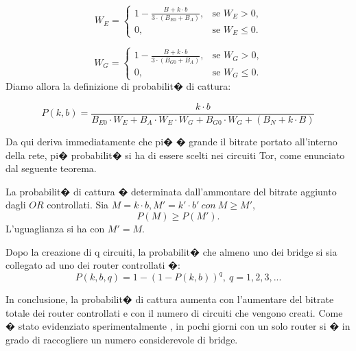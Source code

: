 \begin{equation}
W_E=
\begin{cases}
1-\frac{B+k \cdot b}{3 \cdot (B_{E0}+B_A)},      	& \text{se $W_E>0$,} \\
0, 									& \text{se $W_E\le0$.}
\end{cases}
\end{equation}

\begin{equation}
W_G=
\begin{cases}
1-\frac{B+k \cdot b}{3 \cdot (B_{G0}+B_A)},      	& \text{se $W_G>0$,} \\
0, 									& \text{se $W_G\le0$.}
\end{cases}
\end{equation}
Diamo allora la definizione di probabilit� di cattura:

\begin{teorema}
\begin{equation}
\label{eqn:probcatch}
P(k,b) = \frac{k\cdot b}{B_{E0} \cdot W_E + B_A \cdot W_E \cdot W_G + B_{G0} \cdot W_G + (B_N+ k \cdot B)}
\end{equation}
\end{teorema}
Da qui deriva immediatamente che pi� � grande il bitrate portato all'interno della rete, pi� probabilit� si ha di essere scelti nei circuiti Tor, come enunciato dal seguente teorema.

\begin{teorema}
La probabilit� di cattura � determinata dall'ammontare del bitrate aggiunto dagli $OR$ controllati. Sia $M = k \cdot b, M' = k' \cdot b' \ con \ M \ge M'$,
\begin{equation}
\label{eqn:ammband}
P(M) \ge P(M').
\end{equation}
L'uguaglianza si ha con $M'=M$.
\end{teorema}

\begin{teorema}
Dopo la creazione di q circuiti, la probabilit� che almeno uno dei bridge si sia collegato ad uno dei router controllati �:
\begin{equation}
\label{eqn:ammband}
P(k,b,q) = 1- (1-P(k,b))^{q}, \ q=1,2,3,...
\end{equation}
\end{teorema}
In conclusione, la probabilit� di cattura aumenta con l'aumentare del bitrate totale dei router controllati e con il numero di circuiti che vengono creati.
Come � stato evidenziato sperimentalmente \cite{torbridge}, in pochi giorni con un solo router si � in grado di raccogliere un numero considerevole di bridge.

